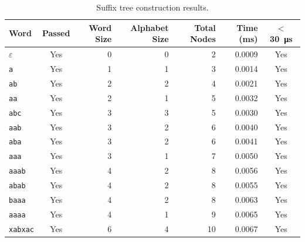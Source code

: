 \documentclass{article}
\begin{document}
	\begin{table}[ht]
	\centering
	\caption{Suffix tree construction results.}
	\label{tab:results}
	\scriptsize
	\setlength{\tabcolsep}{3.5pt}
	\renewcommand{\arraystretch}{1.25}
	\setlength{\aboverulesep}{0pt}
	\setlength{\belowrulesep}{0pt}
	\begin{tabular}{l c r r r r c}
		\toprule
		\rowcolor{blue!15}
		Word & Passed & Word Size & Alphabet Size & Total Nodes & Time (ms) & $<$ \qty{30}{\micro\second} \\
		\midrule
		$\varepsilon$                    & \textcolor{green!50!black}{Yes} &  0 & 0 &  2 & 0.0009 & \textcolor{green!50!black}{Yes} \\
		\texttt{a}                       & \textcolor{green!50!black}{Yes} &  1 & 1 &  3 & 0.0014 & \textcolor{green!50!black}{Yes} \\
		\texttt{ab}                      & \textcolor{green!50!black}{Yes} &  2 & 2 &  4 & 0.0021 & \textcolor{green!50!black}{Yes} \\
		\texttt{aa}                      & \textcolor{green!50!black}{Yes} &  2 & 1 &  5 & 0.0032 & \textcolor{green!50!black}{Yes} \\
		\texttt{abc}                     & \textcolor{green!50!black}{Yes} &  3 & 3 &  5 & 0.0030 & \textcolor{green!50!black}{Yes} \\
		\texttt{aab}                     & \textcolor{green!50!black}{Yes} &  3 & 2 &  6 & 0.0040 & \textcolor{green!50!black}{Yes} \\
		\texttt{aba}                     & \textcolor{green!50!black}{Yes} &  3 & 2 &  6 & 0.0041 & \textcolor{green!50!black}{Yes} \\
		\texttt{aaa}                     & \textcolor{green!50!black}{Yes} &  3 & 1 &  7 & 0.0050 & \textcolor{green!50!black}{Yes} \\
		\texttt{aaab}                    & \textcolor{green!50!black}{Yes} &  4 & 2 &  8 & 0.0056 & \textcolor{green!50!black}{Yes} \\
		\texttt{abab}                    & \textcolor{green!50!black}{Yes} &  4 & 2 &  8 & 0.0055 & \textcolor{green!50!black}{Yes} \\
		\texttt{baaa}                    & \textcolor{green!50!black}{Yes} &  4 & 2 &  8 & 0.0063 & \textcolor{green!50!black}{Yes} \\
		\texttt{aaaa}                    & \textcolor{green!50!black}{Yes} &  4 & 1 &  9 & 0.0065 & \textcolor{green!50!black}{Yes} \\
		\texttt{xabxac}                  & \textcolor{green!50!black}{Yes} &  6 & 4 & 10 & 0.0067 & \textcolor{green!50!black}{Yes} \\

\end{tabular}
\end{table}
\end{document}

